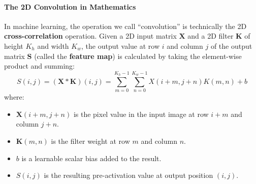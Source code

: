 \paragraph{The 2D Convolution in Mathematics}
In machine learning, the operation we call ``convolution'' is technically the 2D \textbf{cross-correlation} operation. Given a 2D input matrix $\mathbf{X}$ and a 2D filter $\mathbf{K}$ of height $K_h$ and width $K_w$, the output value at row $i$ and column $j$ of the output matrix $\mathbf{S}$ (called the \textbf{feature map}) is calculated by taking the element-wise product and summing:
\begin{equation}
S(i, j) = (\mathbf{X} * \mathbf{K})(i, j) = \sum_{m=0}^{K_h - 1} \sum_{n=0}^{K_w - 1} X(i + m, j + n) K(m, n) + b\label{eq:conv2d_scalar}
\end{equation}
where:
\begin{itemize}
    \item $\mathbf{X}(i+m, j+n)$ is the pixel value in the input image at row $i+m$ and column $j+n$.
    \item $\mathbf{K}(m, n)$ is the filter weight at row $m$ and column $n$.
    \item $b$ is a learnable scalar bias added to the result.
    \item $S(i, j)$ is the resulting pre-activation value at output position $(i, j)$.
\end{itemize}

